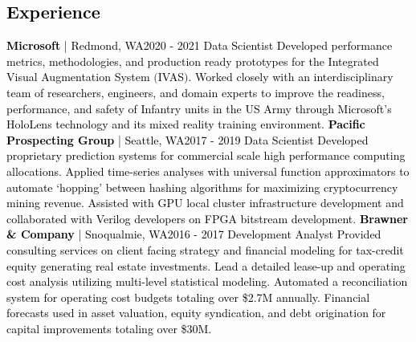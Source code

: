 \documentclass{article}
\begin{document}
    \begin{bgbox}[
        height = \paperheight,
        width = 0.69\textwidth,
        colback = white
    ]
        \textcolor{black}{
            \section*{Experience}
                \textbf{Microsoft} | Redmond, WA\hfill{2020 - 2021}\newline
                Data Scientist\newline\newline
                Developed performance metrics, methodologies, and production ready prototypes for the Integrated Visual Augmentation System $($IVAS$)$. Worked closely with an interdisciplinary team of researchers, engineers, and domain experts to improve the readiness, performance, and safety of Infantry units in the US Army through Microsoft’s HoloLens technology and its mixed reality training environment.\newline\newline
                \textbf{Pacific Prospecting Group} | Seattle, WA\hfill{2017 - 2019}\newline
                Data Scientist\newline\newline
                Developed proprietary prediction systems for commercial scale high performance computing allocations. Applied time-series analyses with universal function approximators to automate ‘hopping’ between hashing algorithms for maximizing cryptocurrency mining revenue. Assisted with GPU local cluster infrastructure development and collaborated with Verilog developers on FPGA bitstream development.\newline\newline
                \textbf{Brawner \& Company} | Snoqualmie, WA\hfill{2016 - 2017}\newline
                Development Analyst\newline\newline
                Provided consulting services on client facing strategy and financial modeling for tax-credit equity generating real estate investments. Lead a detailed lease-up and operating cost analysis utilizing multi-level statistical modeling. Automated a reconciliation system for operating cost budgets totaling over \$2.7M annually. Financial forecasts used in asset valuation, equity syndication, and debt origination for capital improvements totaling over \$30M.\newline\newline
}
\end{bgbox}
\end{document}
